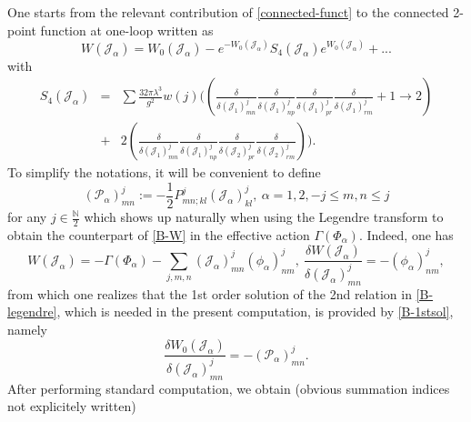 \documentclass[a4paper,11pt,twoside]{article}
\numberwithin{equation}{section}
\theoremstyle{nonumberplain}
\newcounter{and}
\begin{document}
One starts from the relevant contribution of \eqref{connected-funct} to the connected 2-point function at one-loop written as
\begin{equation}
W(\mathcal{J}_\alpha)=W_0(\mathcal{J}_\alpha)-e^{-W_0(\mathcal{J}_\alpha)}S_4(\mathcal{J}_\alpha)e^{W_0(\mathcal{J}_\alpha)}+...\label{B-W}
\end{equation}
with
\begin{eqnarray}
S_4(\mathcal{J}_\alpha)&=&\sum\frac{32\pi\lambda^3}{g^2}w(j)\big((\frac{\delta}{\delta(\mathcal{J}_1)^j_{mn}}\frac{\delta}{\delta(\mathcal{J}_1)^j_{np}}\frac{\delta}{\delta(\mathcal{J}_1)^j_{pr}}\frac{\delta}{\delta(\mathcal{J}_1)^j_{rm}}+1\to2)\nonumber\\
&+&2(\frac{\delta}{\delta(\mathcal{J}_1)^j_{mn}}\frac{\delta}{\delta(\mathcal{J}_1)^j_{np}}\frac{\delta}{\delta(\mathcal{J}_2)^j_{pr}}\frac{\delta}{\delta(\mathcal{J}_2)^j_{rm}})\big).\label{B-S4}
\end{eqnarray}
To simplify the notations, it will be convenient to define 
\begin{equation}
(\mathcal{P}_\alpha)^j_{mn}:=-\frac{1}{2}P^j_{mn;kl}(\mathcal{J}_\alpha)^j_{kl},\ 
\alpha=1,2, -j\le m,n\le j\label{B-1stsol}
\end{equation}
for any $j\in\frac{\mathbb{N}}{2}$ which shows up naturally when using the Legendre transform to obtain the counterpart of \eqref{B-W} in the effective action $\Gamma(\Phi_\alpha)$. Indeed, one has
\begin{equation}
W(\mathcal{J}_\alpha)=-\Gamma(\Phi_\alpha)-\sum_{j,m,n}(\mathcal{J}_\alpha)^j_{mn}(\phi_\alpha)^j_{nm},\ \frac{\delta W(\mathcal{J}_\alpha)}{\delta(\mathcal{J}_\alpha)^j_{mn}}=-(\phi_\alpha)^j_{nm},\label{B-legendre}
\end{equation}
from which one realizes that the 1st order solution of the 2nd relation in \eqref{B-legendre}, which is needed in the present computation, is provided by \eqref{B-1stsol}, namely
\begin{equation}
\frac{\delta W_0(\mathcal{J}_\alpha)}{\delta(\mathcal{J}_\alpha)^j_{mn}}=-(\mathcal{P}_\alpha)^j_{mn}.
\end{equation}
After performing standard computation, we obtain (obvious summation indices not explicitely written)
\end{document}

